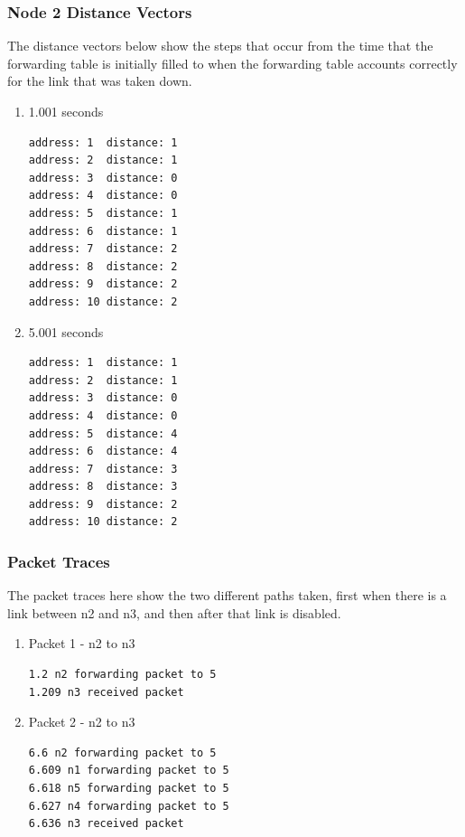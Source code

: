 \documentclass[fleqn,11pt]{article}
\begin{document}
	{
		\subsubsection{Node 2 Distance Vectors}
		The distance vectors below show the steps that occur from the time that the forwarding table is initially filled
		to when the forwarding table accounts correctly for the link that was taken down.
		
		\vspace{.3cm}
		
		\begin{enumerate}
			\item 1.001 seconds
			
\begin{lstlisting}
address: 1	distance: 1
address: 2	distance: 1
address: 3	distance: 0
address: 4	distance: 0
address: 5	distance: 1
address: 6	distance: 1
address: 7	distance: 2
address: 8	distance: 2
address: 9	distance: 2
address: 10	distance: 2
\end{lstlisting}

			\item 5.001 seconds

\begin{lstlisting}
address: 1	distance: 1
address: 2	distance: 1
address: 3	distance: 0
address: 4	distance: 0
address: 5	distance: 4
address: 6	distance: 4
address: 7	distance: 3
address: 8	distance: 3
address: 9	distance: 2
address: 10	distance: 2
\end{lstlisting}

		\end{enumerate}
		
		\subsubsection{Packet Traces}
		The packet traces here show the two different paths taken, first when there is a link between n2 and n3, and then
		after that link is disabled.
		
		\begin{enumerate}
			\item Packet 1 - n2 to n3
		
\begin{lstlisting}
1.2 n2 forwarding packet to 5
1.209 n3 received packet
\end{lstlisting}

			\item Packet 2 - n2 to n3

\begin{lstlisting}
6.6 n2 forwarding packet to 5
6.609 n1 forwarding packet to 5
6.618 n5 forwarding packet to 5
6.627 n4 forwarding packet to 5
6.636 n3 received packet
\end{lstlisting}

		\end{enumerate}
	}
\end{document}

